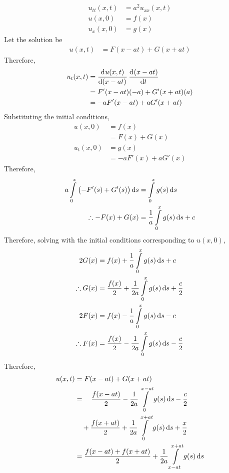 \documentclass[titlepage, fleqn, a4paper, 12pt, twoside]{article}
\theoremstyle{definition}
\theoremstyle{theorem}
\begin{document}
\begin{align*}
	u_{t t}(x,t) & = a^2 u_{x x}(x,t) \\
	u(x,0)       & = f(x)             \\
	u_x(x,0)     & = g(x)
\end{align*}
Let the solution be
\begin{align*}
	u(x,t) & = F(x - a t) + G(x + a t)
\end{align*}
Therefore,
\begin{align*}
	u_t(x,t) & = \dod{u(x,t)}{(x - a t)} \dod{(x - a t)}{t} \\
                 & = F'(x - a t) (-a) + G'(x + a t) (a)         \\
                 & = -a F'(x - a t) + a G'(x + a t)
\end{align*}
Substituting the initial conditions,
\begin{align*}
	u(x,0)   & = f(x)        \\
                 & = F(x) + G(x) \\
	u_t(x,0) & = g(x)        \\
                 & = -a F'(x) + a G'(x)
\end{align*}
Therefore,
\begin{align*}
	a \int\limits_{0}^{x} \left( -F'(s) + G'(s) \right) \dif s & = \int\limits_{0}^{x} g(s) \dif s \\
	\therefore -F(x) + G(x)                                    & = \frac{1}{a} \int\limits_{0}^{x} g(s) \dif s + c
\end{align*}
Therefore, solving with the initial conditions corresponding to $u(x,0)$,
\begin{align*}
	2 G(x)          & = f(x) + \frac{1}{a} \int\limits_{0}^{x} g(s) \dif s + c                       \\
	\therefore G(x) & = \frac{f(x)}{2} + \frac{1}{2 a} \int\limits_{0}^{x} g(s) \dif s + \frac{c}{2} \\
	2 F(x)          & = f(x) - \frac{1}{a} \int\limits_{0}^{x} g(s) \dif s - c                       \\
	\therefore F(x) & = \frac{f(x)}{2} - \frac{1}{2 a} \int\limits_{0}^{x} g(s) \dif s - \frac{c}{2} \\
\end{align*}
Therefore,
\begin{align*}
	u(x,t) & = F(x - a t) + G(x + a t)                                                                        \\
               & = \quad \frac{f(x - a t)}{2} - \frac{1}{2 a} \int\limits_{0}^{x - a t} g(s) \dif s - \frac{c}{2} \\
               & \quad + \frac{f(x + a t)}{2} + \frac{1}{2 a} \int\limits_{0}^{x + a t} g(s) \dif s + \frac{x}{2} \\
               & = \frac{f(x - a t) + f(x + a t)}{2} + \frac{1}{2 a} \int\limits_{x - a t}^{x + a t} g(s) \dif s
\end{align*}
\end{document}
